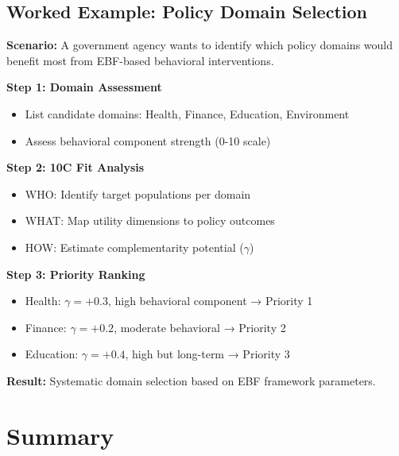 \subsection{Worked Example: Policy Domain Selection}
\label{sec:lll-worked-example}

\begin{tcolorbox}[colback=green!5!white, colframe=green!75!black,
    title=Worked Example: Selecting Policy Domains for EBF Application]

\textbf{Scenario:} A government agency wants to identify which policy domains would benefit most from EBF-based behavioral interventions.

\textbf{Step 1: Domain Assessment}
\begin{itemize}[nosep]
    \item List candidate domains: Health, Finance, Education, Environment
    \item Assess behavioral component strength (0-10 scale)
\end{itemize}

\textbf{Step 2: 10C Fit Analysis}
\begin{itemize}[nosep]
    \item WHO: Identify target populations per domain
    \item WHAT: Map utility dimensions to policy outcomes
    \item HOW: Estimate complementarity potential ($\gamma$)
\end{itemize}

\textbf{Step 3: Priority Ranking}
\begin{itemize}[nosep]
    \item Health: $\gamma = +0.3$, high behavioral component → Priority 1
    \item Finance: $\gamma = +0.2$, moderate behavioral → Priority 2
    \item Education: $\gamma = +0.4$, high but long-term → Priority 3
\end{itemize}

\textbf{Result:} Systematic domain selection based on EBF framework parameters.

\end{tcolorbox}


\section{Summary}
\label{sec:lll-summary}

